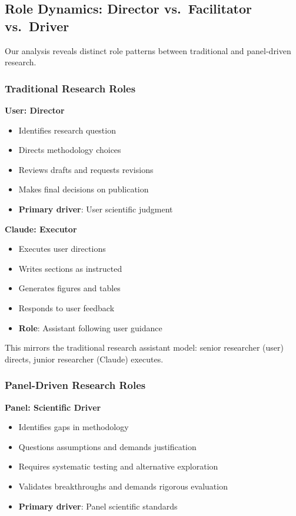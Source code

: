 \subsection{Role Dynamics: Director vs.\ Facilitator vs.\ Driver}

Our analysis reveals distinct role patterns between traditional and panel-driven research.

\subsubsection{Traditional Research Roles}

\textbf{User: Director}
\begin{itemize}[leftmargin=*]
\item Identifies research question
\item Directs methodology choices
\item Reviews drafts and requests revisions
\item Makes final decisions on publication
\item \textbf{Primary driver}: User scientific judgment
\end{itemize}

\textbf{Claude: Executor}
\begin{itemize}[leftmargin=*]
\item Executes user directions
\item Writes sections as instructed
\item Generates figures and tables
\item Responds to user feedback
\item \textbf{Role}: Assistant following user guidance
\end{itemize}

This mirrors the traditional research assistant model: senior researcher (user) directs, junior researcher (Claude) executes.

\subsubsection{Panel-Driven Research Roles}

\textbf{Panel: Scientific Driver}
\begin{itemize}[leftmargin=*]
\item Identifies gaps in methodology
\item Questions assumptions and demands justification
\item Requires systematic testing and alternative exploration
\item Validates breakthroughs and demands rigorous evaluation
\item \textbf{Primary driver}: Panel scientific standards
\end{itemize}

